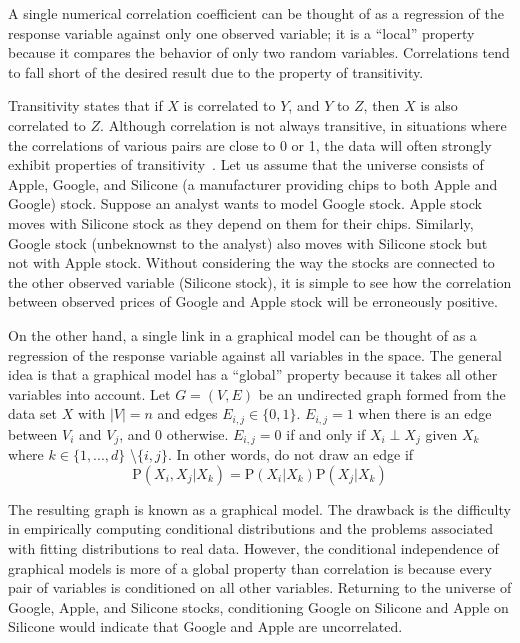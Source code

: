A single numerical correlation coefficient can be 
thought of as a regression of the response variable
against only one observed variable; it is a ``local'' property because it
compares the behavior of only two random variables. Correlations tend to fall 
short of the desired result due to the property of transitivity.

Transitivity states that if $X$ is correlated to $Y$, and $Y$ to $Z$,
then $X$ is also correlated to $Z$. Although correlation is not always
transitive, in situations where the correlations of various pairs are close to 
0 or 1, the data will often strongly exhibit properties of 
transitivity~\cite{tao2014}. Let us assume that the universe consists of Apple, 
Google, and Silicone (a manufacturer providing chips to both Apple and Google) 
stock. Suppose an analyst wants to model Google stock. 
Apple stock moves with Silicone stock as they
depend on them for their chips. Similarly, Google stock (unbeknownst to the
analyst) also moves with Silicone stock but not with Apple stock. Without 
considering the way the stocks are connected to the other observed variable 
(Silicone stock), it is simple to see how the correlation between observed 
prices of Google and Apple stock will be erroneously positive.

On the other hand, a single link in a graphical model can be thought of as a 
regression of the response variable against all variables in the space. The 
general idea is that a graphical model has a ``global'' property because it 
takes all other variables into account. Let $G=(V,E)$ be an undirected graph 
formed from the data set $X$ with $|V| =  n$ and edges $E_{i,j}\in\{0,1\}$. 
$E_{i,j}=1$ when there is an edge between $V_i$ and $V_j$, and 0 otherwise. 
$E_{i,j}=0$ if and only if $X_i \perp X_j$ given $X_k$ where $k\in\{1,...,d\}$ 
\textbackslash $\{i,j\}$. In other words, do not draw an edge if
$$\text{P}(X_i,X_j|X_k)=\text{P}(X_i|X_k)\text{P}(X_j|X_k)$$

The resulting graph is known as a graphical model. The drawback is the 
difficulty in empirically computing conditional distributions and the problems 
associated with fitting distributions to real data. 
However, the conditional independence of graphical models is more of a global 
property than correlation is because every pair of variables is conditioned on 
all other variables. Returning to the universe of Google, Apple, and Silicone 
stocks, conditioning Google on Silicone and Apple on Silicone would indicate 
that Google and Apple are uncorrelated. 

